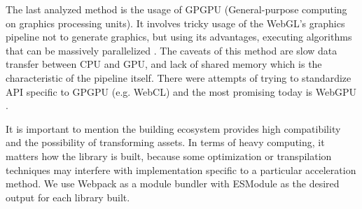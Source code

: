 The last analyzed method is the usage of GPGPU (General-purpose computing on graphics processing units). It involves tricky usage of the WebGL's graphics pipeline not to generate graphics, but using its advantages, executing algorithms that can be massively parallelized \cite{sapuan2018general}. The caveats of this method are slow data transfer between CPU and GPU, and lack of shared memory which is the characteristic of the pipeline itself. There were attempts of trying to standardize API specific to GPGPU (e.g. WebCL) and the most promising today is WebGPU \cite{webgpu_2022}.

It is important to mention the building ecosystem provides high compatibility and the possibility of transforming assets. In terms of heavy computing, it matters how the library is built, because some optimization or transpilation techniques may interfere with implementation specific to a particular acceleration method. We use Webpack \cite{webpack} as a module bundler with ESModule \cite{PALTOGLOU2021111049} as the desired output for each library built.

